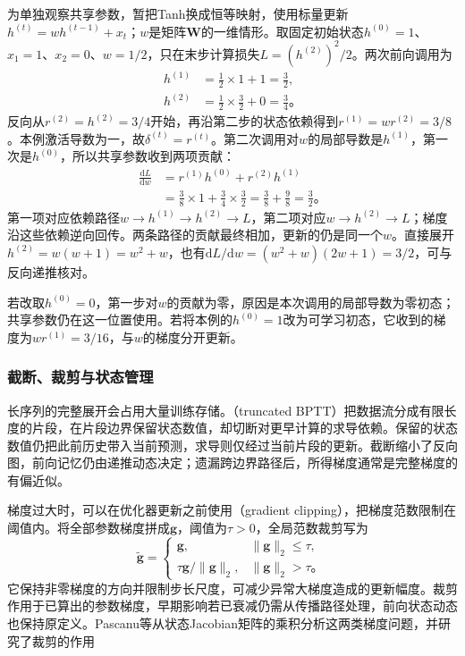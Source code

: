 \begin{example}[两步递推中的梯度累积]
  \label{ex:rnn-shared-gradient}
  为单独观察共享参数，暂把Tanh换成恒等映射，使用标量更新$h^{(t)}=w h^{(t-1)}+x_t$；$w$是矩阵$\bm W$的一维情形。取固定初始状态$h^{(0)}=1$、$x_1=1$、$x_2=0$、$w=1/2$，只在末步计算损失$L=(h^{(2)})^2/2$。两次前向调用为
  \[
    \begin{aligned}
      h^{(1)}&=\tfrac12\times1+1=\tfrac32,\\
      h^{(2)}&=\tfrac12\times\tfrac32+0=\tfrac34\text{。}
    \end{aligned}
  \]
  反向从$r^{(2)}=h^{(2)}=3/4$开始，再沿第二步的状态依赖得到$r^{(1)}=w r^{(2)}=3/8$。本例激活导数为一，故$\delta^{(t)}=r^{(t)}$。第二次调用对$w$的局部导数是$h^{(1)}$，第一次是$h^{(0)}$，所以共享参数收到两项贡献：
  \[
    \begin{aligned}
      \frac{\mathrm dL}{\mathrm dw}
        &=r^{(1)}h^{(0)}+r^{(2)}h^{(1)}\\
        &=\tfrac38\times1+\tfrac34\times\tfrac32
          =\tfrac38+\tfrac98=\tfrac32\text{。}
    \end{aligned}
  \]
  第一项对应依赖路径$w\to h^{(1)}\to h^{(2)}\to L$，第二项对应$w\to h^{(2)}\to L$；梯度沿这些依赖逆向回传。两条路径的贡献最终相加，更新的仍是同一个$w$。直接展开$h^{(2)}=w(w+1)=w^2+w$，也有$\mathrm dL/\mathrm dw=(w^2+w)(2w+1)=3/2$，可与反向递推核对。

  若改取$h^{(0)}=0$，第一步对$w$的贡献为零，原因是本次调用的局部导数为零初态；共享参数仍在这一位置使用。若将本例的$h^{(0)}=1$改为可学习初态，它收到的梯度为$w r^{(1)}=3/16$，与$w$的梯度分开更新。
\end{example}

\subsubsection{截断、裁剪与状态管理}
\label{sec:rnn-truncation}

长序列的完整展开会占用大量训练存储。（truncated BPTT）把数据流分成有限长度的片段，在片段边界保留状态数值，却切断对更早计算的求导依赖。保留的状态数值仍把此前历史带入当前预测，求导则仅经过当前片段的更新。截断缩小了反向图，前向记忆仍由递推动态决定；遗漏跨边界路径后，所得梯度通常是完整梯度的有偏近似。

梯度过大时，可以在优化器更新之前使用（gradient clipping），把梯度范数限制在阈值内。将全部参数梯度拼成$\bm{g}$，阈值为$\tau>0$，全局范数裁剪写为
\begin{equation}
  \widetilde{\bm{g}}=
  \begin{cases}
    \bm{g},&\lVert\bm{g}\rVert_2\leq\tau,\\
    \tau\bm{g}/\lVert\bm{g}\rVert_2,&\lVert\bm{g}\rVert_2>\tau\text{。}
  \end{cases}
  \label{eq:rnn-gradient-clipping}
\end{equation}
它保持非零梯度的方向并限制步长尺度，可减少异常大梯度造成的更新幅度。裁剪作用于已算出的参数梯度，早期影响若已衰减仍需从传播路径处理，前向状态动态也保持原定义。Pascanu等从状态Jacobian矩阵的乘积分析这两类梯度问题，并研究了裁剪的作用

